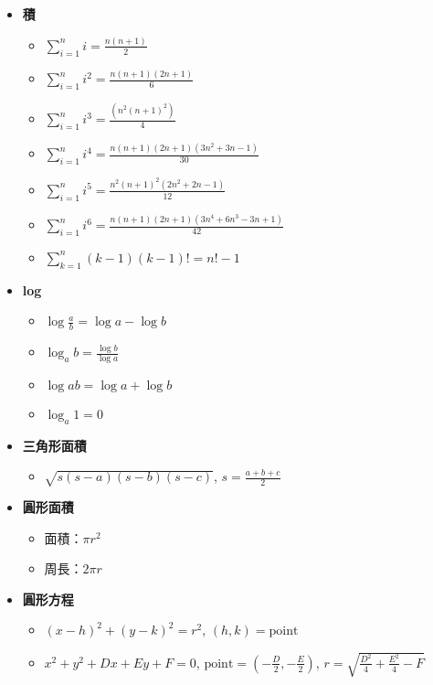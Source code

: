 \usepackage{amsmath}

\begin{itemize}
  \item \textbf{積}
  \begin{itemize}
    \item $\sum \limits_{i=1}^n i = \frac{n(n+1)}{2}$
    \item $\sum \limits_{i=1}^n i^2 = \frac{n(n+1)(2n+1)}{6}$
    \item $\sum \limits_{i=1}^n i^3 = \frac{(n^2(n+1)^2)}{4}$
    \item $\sum \limits_{i=1}^n i^4 = \frac{n(n+1)(2n+1)(3n^2+3n-1)}{30}$
    \item $\sum \limits_{i=1}^n i^5 = \frac{n^2(n+1)^2(2n^2+2n-1)}{12}$
    \item $\sum \limits_{i=1}^n i^6 = \frac{n(n+1)(2n+1)(3n^4+6n^3-3n+1)}{42}$
    \item $\sum \limits_{k=1}^n (k-1)(k-1)! = n!-1$
  \end{itemize}
  
  \item \textbf{log}
  \begin{itemize}
    \item $\log\frac{a}{b} = \log a - \log b$
    \item $\log_a b = \frac{\log b}{\log a}$
    \item $\log ab = \log a + \log b$
    \item $\log_a 1 = 0$
  \end{itemize}
  
  \item \textbf{三角形面積}
  \begin{itemize}
    \item $\sqrt{s(s-a)(s-b)(s-c)}$, $s = \frac{a+b+c}{2}$
  \end{itemize}

  \item \textbf{圓形面積}
  \begin{itemize}
    \item 面積：$\pi r^2$
    \item 周長：$2\pi r$
  \end{itemize}

  \item \textbf{圓形方程}
  \begin{itemize}
    \item $(x-h)^2+(y-k)^2 = r^2$, $(h, k) = \text{point}$
    \item $x^2 + y^2 + Dx + Ey + F = 0$, $\text{point}=\left(-\frac{D}{2}, -\frac{E}{2}\right)$, $r = \sqrt{\frac{D^2}{4}+\frac{E^2}{4}-F}$
  \end{itemize}


\end{itemize}
